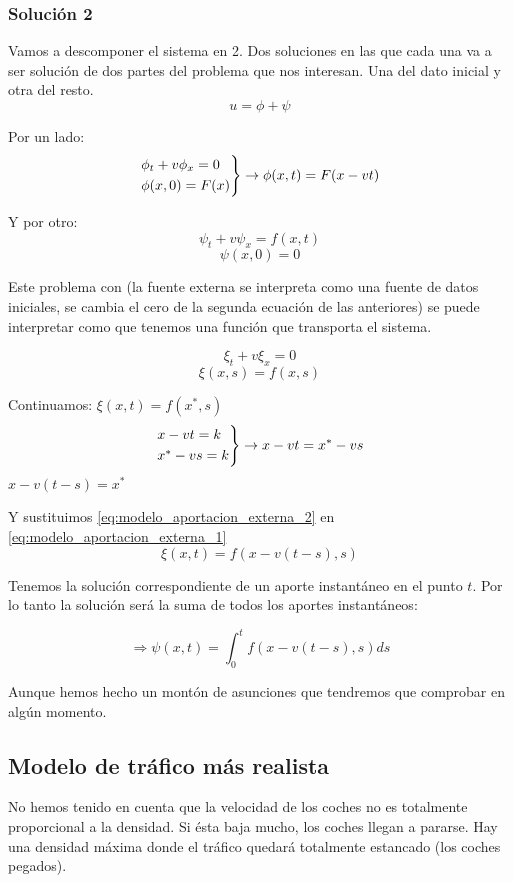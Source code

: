 		\subsubsection{Solución 2}

			Vamos a descomponer el sistema en 2. Dos soluciones en las que cada una va a ser solución de dos partes del problema que nos interesan. Una del dato inicial y otra del resto.
			$$u = \phi + \psi$$

			Por un lado:
			$$
			\begin{rcases}
				\phi_t + v\phi_x = 0 \\
				\phi(x,0) = F(x)
			\end{rcases}
			\rightarrow \phi(x,t) = F(x-vt)
			$$

			Y por otro:
			$$\psi_t + v\psi_x = f(x,t)$$
			$$\psi(x,0) = 0$$

			Este problema con  (la fuente externa se interpreta como una fuente de datos iniciales, se cambia el cero de la segunda ecuación de las anteriores) se puede interpretar como que tenemos una función que transporta el sistema.

			$$\xi_t + v\xi_x = 0$$
			$$\xi(x,s) = f(x,s)$$

			Continuamos:
			\(\xi(x,t) = f(x^*,s) \label{eq:modelo_aportacion_externa_1}\)
			$$
			\begin{rcases}
				x-vt = k \\
				x^* - vs = k
			\end{rcases}
			 \rightarrow x-vt = x^* - vs
			$$
			\( x-v(t-s) = x^{*} \label{eq:modelo_aportacion_externa_2} \)

			Y sustituimos \ref{eq:modelo_aportacion_externa_2} en \ref{eq:modelo_aportacion_externa_1}
			$$\xi(x,t) = f(x - v(t-s), s)$$


			Tenemos la solución correspondiente de un aporte instantáneo en el punto $t$. Por lo tanto la solución será la suma de todos los aportes instantáneos:

			$$\Rightarrow \psi(x,t) = \int^{t}_{0} f(x-v(t-s),s) ds $$

			Aunque hemos hecho un montón de asunciones que tendremos que comprobar en algún momento.

	\subsection{Modelo de tráfico más realista}

		No hemos tenido en cuenta que la velocidad de los coches no es totalmente proporcional a la densidad. Si ésta baja mucho, los coches llegan a pararse. Hay una densidad máxima donde el tráfico quedará totalmente estancado (los coches pegados).

